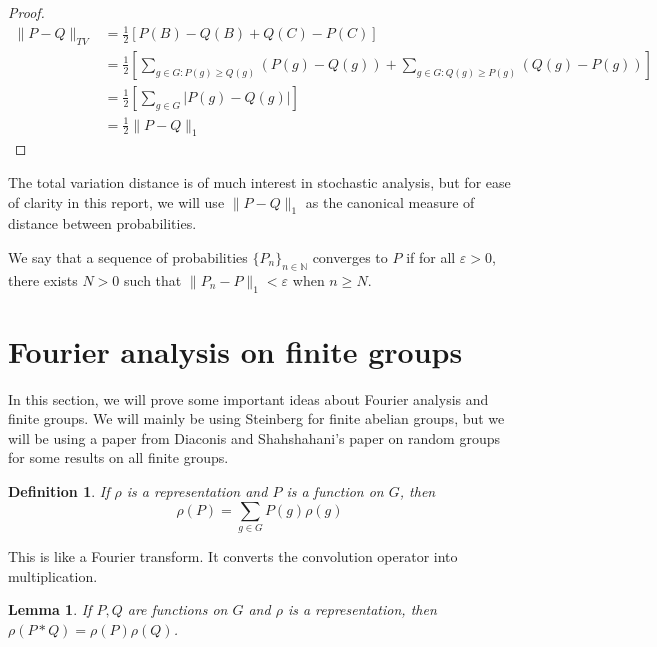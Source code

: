 \documentclass[]{article}
\newtheorem{lemma}[theorem]{Lemma}
\newtheorem{definition}[theorem]{Definition}
\theoremstyle{definition}
\numberwithin{theorem}{section}
\numberwithin{equation}{section}
\begin{document}
\begin{proof}
	\begin{align*}
		\|P - Q\|_{TV} &= \frac{1}{2}[P(B) - Q(B) + Q(C) - P(C)]\\
		&=\frac{1}{2}\left[ \sum_{g \in G : P(g) \geq Q(g)} (P(g) - Q(g)) + \sum_{g \in G : Q(g) \geq P(g)} (Q(g) - P(g)) \right]\\
		&= \frac{1}{2}\left[ \sum_{g \in G}|P(g) - Q(g)| \right]\\
		&= \frac{1}{2}\|P - Q\|_1
	\end{align*}
\end{proof}

The total variation distance is of much interest in stochastic analysis, but for ease of clarity in this report, we will use $\|P - Q\|_1$ as the canonical measure of distance between probabilities. 

We say that a sequence of probabilities $\lbrace P_n \rbrace_{n \in \mathbb{N}}$ converges to $P$ if for all $\varepsilon > 0$, there exists $N > 0$ such that $\|P_n - P \|_1 < \varepsilon$ when $n \geq N$. 

\section{Fourier analysis on finite groups}
In this section, we will prove some important ideas about Fourier analysis and finite groups. We will mainly be using Steinberg \cite{steinbergProbabilityRandomWalks2012} for finite abelian groups, but we will be using a paper from Diaconis and Shahshahani's paper on random groups \cite{diaconisGeneratingRandomPermutation1981} for some results on all finite groups. 

\begin{definition}
	If $\rho$ is a representation and $P$ is a function on $G$, then
	\begin{equation}
		\rho(P) = \sum_{g \in G} P(g) \rho(g)
	\end{equation}
\end{definition}

This is like a Fourier transform. It converts the convolution operator into multiplication.

\begin{lemma}\label{lem:rep_ast}
	If $P, Q$ are functions on $G$ and $\rho$ is a representation, then $\rho(P \ast Q) = \rho(P) \rho(Q)$.
\end{lemma}
\end{document}
